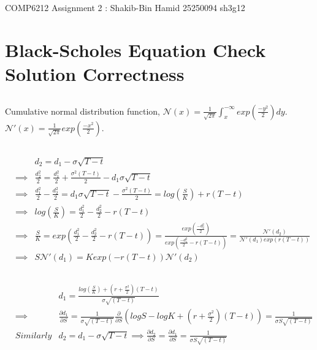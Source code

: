 \documentclass[11pt, fleqn]{article}
\begin{document}
\begin{center}

\Large{COMP6212 Assignment 2 : Shakib-Bin Hamid 25250094 sh3g12}

\end{center}

\section{Black-Scholes Equation Check Solution Correctness}

\subsection{}
Cumulative normal distribution function, $\mathcal{N}(x) = \frac{1}{\sqrt{2\pi}} \int_x^{-\infty} exp(\frac{-y^2}{2})dy$. $\mathcal{N}'(x) = \frac{1}{\sqrt{2\pi}}exp(\frac{-x^2}{2})$.

\subsection{}
\vspace{-1cm}
\begin{eqnarray*}
&& d_2 = d_1 - \sigma\sqrt{T-t}\\
&\implies& \frac{d_2^2}{2} = \frac{d_1^2}{2} + \frac{\sigma^2(T-t)}{2} - d_1\sigma\sqrt{T-t}\\
&\implies& \frac{d_1^2}{2} - \frac{d_2^2}{2} = d_1\sigma\sqrt{T-t} - \frac{\sigma^2(T-t)}{2} = log(\frac{S}{K}) + r(T-t)\\
&\implies& log(\frac{S}{K}) = \frac{d_1^2}{2} - \frac{d_2^2}{2} - r(T-t)\\
&\implies& \frac{S}{K} = exp(\frac{d_1^2}{2} - \frac{d_2^2}{2} - r(T-t)) = \frac{exp(\frac{-d_2^2}{2})}{exp(\frac{-d_1^2}{2} - r(T-t))} = \frac{\mathcal{N}'(d_2)}{\mathcal{N}'(d_1)exp(r(T-t))}\\
&\implies& S\mathcal{N}'(d_1) = Kexp(-r(T-t))\mathcal{N}'(d_2) 
\end{eqnarray*}

\subsection{}
\vspace{-1cm}
\begin{eqnarray*}
&& d_1 = \frac{log(\frac{S}{K})+(r+\frac{\sigma^2}{2})(T-t)}{\sigma\sqrt{(T-t)}} \\
&\implies& \frac{\partial d_1}{\partial S} = \frac{1}{\sigma\sqrt{(T-t)}} \frac{\partial}{\partial S}(logS - logK + (r+\frac{\sigma^2}{2})(T-t)) = \frac{1}{\sigma S \sqrt{(T-t)}}\\
&Similarly& d_2 = d_1 - \sigma\sqrt{T-t} \implies \frac{\partial d_2}{\partial S} = \frac{\partial d_1}{\partial S}= \frac{1}{\sigma S \sqrt{(T-t)}}
\end{eqnarray*}
\end{document}
